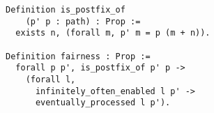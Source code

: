 \begin{lstlisting}
Definition is_postfix_of
    (p' p : path) : Prop :=
  exists n, (forall m, p' m = p (m + n)).

Definition fairness : Prop :=
  forall p p', is_postfix_of p' p ->
    (forall l,
      infinitely_often_enabled l p' ->
      eventually_processed l p').
\end{lstlisting}
